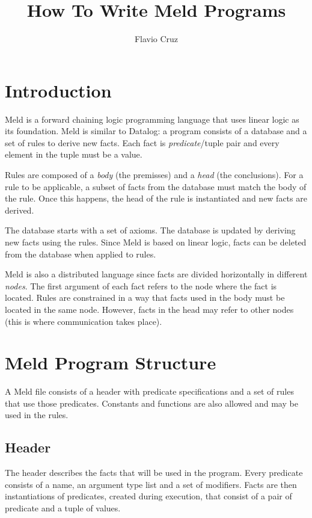 \documentclass[11pt]{article}
\title{How To Write Meld Programs}
\author{Flavio Cruz}
\begin{document}
\maketitle

\section{Introduction}

Meld is a forward chaining logic programming language that uses linear logic as its foundation.
Meld is similar to Datalog: a program consists of a database and a set of rules to derive new facts.
Each fact is \emph{predicate}/tuple pair and every element in the tuple must be a value.

Rules are composed of a \emph{body} (the premisses) and a \emph{head} (the conclusions). For a rule
to be applicable, a subset of facts from the database must match the body of the rule. Once this happens,
the head of the rule is instantiated and new facts are derived.

The database starts with a set of axioms. The database is updated by deriving new facts using the rules.
Since Meld is based on linear logic, facts can be deleted from the database when applied to rules.

Meld is also a distributed language since facts are divided horizontally in different \emph{nodes}.
The first argument of each fact refers to the node where the fact is located. Rules are constrained
in a way that facts used in the body must be located in the same node. However, facts in the head may
refer to other nodes (this is where communication takes place).

\section{Meld Program Structure}

A Meld file consists of a header with predicate specifications and a set of rules that use those predicates.
Constants and functions are also allowed and may be used in the rules.

\subsection{Header}

The header describes the facts that will be used in the program. Every predicate consists of a name, an argument type list and a set of modifiers.
Facts are then instantiations of predicates, created during execution, that consist of a pair of predicate and a tuple of values.
\end{document}
